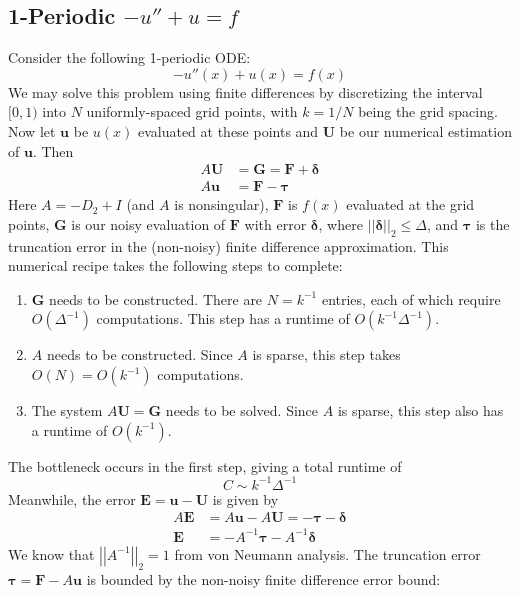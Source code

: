 \documentclass[letterpaper,11pt]{article}
\newcommand*{\abs}[1]{\left| #1 \right|}
\newcommand*{\norm}[1]{\abs{\abs{#1}}}
\begin{document}
\begin{flushleft}
    \subsection{1-Periodic $-u'' + u = f$}
    Consider the following 1-periodic ODE:
    $$-u''(x) + u(x) = f(x)$$
    We may solve this problem using finite differences by discretizing the interval $[0, 1)$ into $N$ uniformly-spaced grid points, with $k = 1/N$ being the grid spacing. Now let $\mathbf{u}$ be $u(x)$ evaluated at these points and $\mathbf{U}$ be our numerical estimation of $\mathbf{u}$. Then
    \begin{align*}
        A\mathbf{U} &= \mathbf{G} = \mathbf{F} + \mathbf{\delta} \\
        A\mathbf{u} &= \mathbf{F} - \mathbf{\tau}
    \end{align*}
    Here $A = -D_2 + I$ (and $A$ is nonsingular), $\mathbf{F}$ is $f(x)$ evaluated at the grid points, $\mathbf{G}$ is our noisy evaluation of $\mathbf{F}$ with error $\mathbf{\delta}$, where $\norm{\mathbf{\delta}}_2 \leq \Delta$, and $\mathbf{\tau}$ is the truncation error in the (non-noisy) finite difference approximation. This numerical recipe takes the following steps to complete:
    \begin{enumerate}
        \item $\mathbf{G}$ needs to be constructed. There are $N = k^{-1}$ entries, each of which require $O(\Delta^{-1})$ computations. This step has a runtime of $O(k^{-1}\Delta^{-1})$.
        \item $A$ needs to be constructed. Since $A$ is sparse, this step takes $O(N) = O(k^{-1})$ computations.
        \item The system $A\mathbf{U} = \mathbf{G}$ needs to be solved. Since $A$ is sparse, this step also has a runtime of $O(k^{-1})$.
    \end{enumerate}
    The bottleneck occurs in the first step, giving a total runtime of
    $$\boxed{C \sim k^{-1}\Delta^{-1}}$$
    Meanwhile, the error $\mathbf{E} = \mathbf{u} - \mathbf{U}$ is given by
    \begin{align*}
        A\mathbf{E} &= A\mathbf{u} - A\mathbf{U} = -\mathbf{\tau} - \mathbf{\delta} \\
        \mathbf{E} &= -A^{-1}\mathbf{\tau} - A^{-1}\mathbf{\delta}
    \end{align*}
    We know that $\norm{A^{-1}}_2 = 1$ from von Neumann analysis. The truncation error $\mathbf{\tau} = \mathbf{F} - A\mathbf{u}$ is bounded by the non-noisy finite difference error bound:

\end{flushleft}
\end{document}
